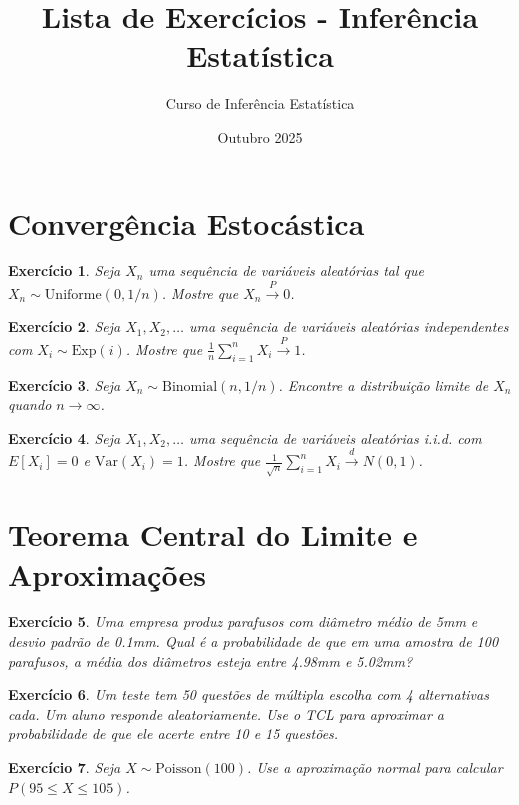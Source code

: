 \documentclass[12pt,a4paper]{article}
\title{Lista de Exercícios - Inferência Estatística}
\author{Curso de Inferência Estatística}
\date{Outubro 2025}
\newtheorem{exercise}{Exercício}
\begin{document}
\maketitle

\section{Convergência Estocástica}

\begin{exercise}
Seja $X_n$ uma sequência de variáveis aleatórias tal que $X_n \sim \text{Uniforme}(0, 1/n)$. Mostre que $X_n \xrightarrow{P} 0$.
\end{exercise}

\begin{exercise}
Seja $X_1, X_2, \ldots$ uma sequência de variáveis aleatórias independentes com $X_i \sim \text{Exp}(i)$. Mostre que $\frac{1}{n}\sum_{i=1}^n X_i \xrightarrow{P} 1$.
\end{exercise}

\begin{exercise}
Seja $X_n \sim \text{Binomial}(n, 1/n)$. Encontre a distribuição limite de $X_n$ quando $n \to \infty$.
\end{exercise}

\begin{exercise}
Seja $X_1, X_2, \ldots$ uma sequência de variáveis aleatórias i.i.d. com $E[X_i] = 0$ e $\text{Var}(X_i) = 1$. Mostre que $\frac{1}{\sqrt{n}}\sum_{i=1}^n X_i \xrightarrow{d} N(0,1)$.
\end{exercise}

\section{Teorema Central do Limite e Aproximações}

\begin{exercise}
Uma empresa produz parafusos com diâmetro médio de 5mm e desvio padrão de 0.1mm. Qual é a probabilidade de que em uma amostra de 100 parafusos, a média dos diâmetros esteja entre 4.98mm e 5.02mm?
\end{exercise}

\begin{exercise}
Um teste tem 50 questões de múltipla escolha com 4 alternativas cada. Um aluno responde aleatoriamente. Use o TCL para aproximar a probabilidade de que ele acerte entre 10 e 15 questões.
\end{exercise}

\begin{exercise}
Seja $X \sim \text{Poisson}(100)$. Use a aproximação normal para calcular $P(95 \leq X \leq 105)$.
\end{exercise}
\end{document}
